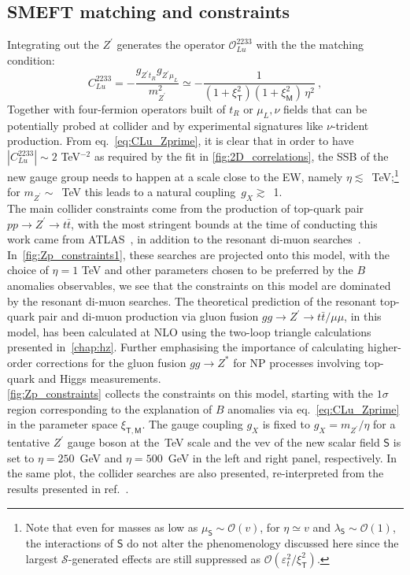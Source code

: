 \subsection{SMEFT matching and constraints}
Integrating out the $Z^{\prime}$ generates the operator $\mathcal O_{L u}^{2233}$ with the the matching condition:
\begin{equation}
	\label{eq:CLu_Zprime}
	C_{L u}^{2233} = - \frac{g_{Z^{\prime} t_{R} } g_{Z^{\prime} \mu_{L}} }{m_{Z^{\prime}}^2} \simeq - \frac{1}{(1+ \xi^2_{\mathsf{T}})(1+ \xi^2_{\mathsf{M}}) \, \eta^{2}} \ ,
\end{equation}
%
Together with four-fermion operators built of $t_{R}$ or $\mu_{L},\nu$  fields that can be potentially probed at collider and by experimental signatures like $\nu$-trident production. 
From eq.~\eqref{eq:CLu_Zprime}, it is clear that in order to have $|C_{L u}^{2233}| \sim 2 $ TeV$^{-2}$ as required  by the fit in \autoref{fig:2D_correlations}, the SSB of the new gauge group needs to happen at a scale close to the EW, namely $\eta \lesssim$~TeV;\footnote{Note that even for masses as low as $\mu_{\mathsf{S}} \sim \mathcal{O}(v)$, for $\eta \simeq v$ and $\lambda_{\mathsf{S}} \sim \mathcal{O}(1)$, the interactions of $\mathsf{S}$ do not alter the phenomenology discussed here since the largest $\mathcal{S}$-generated effects are still suppressed as $\mathcal{O}(\varepsilon_{t}^2/\xi^2_{\mathsf{T}})$.} for $m_{Z^{\prime}} \sim$~TeV this leads to a natural coupling~$g_{X} \gtrsim$~1. \\ The main collider constraints come from the production of top-quark pair $ pp \to Z^\prime \to t \bar t$, with the most stringent bounds at the time of conducting this work came from ATLAS~\cite{ATLAS:2019npw}, in addition to the resonant di-muon searches~\cite{ATLAS-CONF-2019-001}. In~\autoref{fig:Zp_constraints1}, these searches are projected onto this model, with the choice of $\eta=1$ TeV and other parameters chosen to be preferred by the $B$ anomalies observables, we see that the constraints on this model are dominated by the resonant di-muon searches. The theoretical prediction of the resonant top-quark pair and di-muon production via gluon fusion $ gg \to Z^\prime \to t \bar t /\mu \mu$, in this model, has been calculated at NLO using the two-loop triangle calculations presented in~\autoref{chap:hz}. Further emphasising the importance of calculating higher-order corrections for the gluon fusion $ gg \to Z^*$ for NP processes involving top-quark and Higgs measurements. \\
 \autoref{fig:Zp_constraints} collects the constraints on this model, starting with the $1\sigma$ region corresponding to the explanation of $B$ anomalies via eq.~\eqref{eq:CLu_Zprime} in the parameter space $\xi_{\mathsf{T,M}}$. The gauge coupling $g_X$ is fixed to $g_{X} = m_{Z^{\prime}}/\eta$ for a tentative $Z^{\prime}$ gauge boson at the~TeV scale and the vev of the new scalar field $\mathsf{S}$ is set to $\eta = 250$~GeV and $\eta = 500$~GeV  in the left and right panel, respectively. In the same plot, the collider searches are also presented, re-interpreted from the results presented in ref.~\cite{Camargo-Molina:2018cwu}. 
